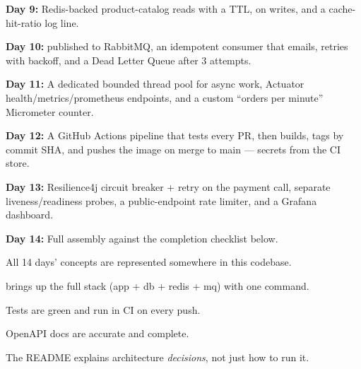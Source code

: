 \begin{checklist}
  \item \textbf{Day 9:} Redis-backed  product-catalog reads with a TTL,  on writes, and a cache-hit-ratio log line.
  \item \textbf{Day 10:}  published to RabbitMQ, an idempotent consumer that emails, retries with backoff, and a Dead Letter Queue after 3 attempts.
  \item \textbf{Day 11:} A dedicated bounded thread pool for async work, Actuator health/metrics/prometheus endpoints, and a custom ``orders per minute'' Micrometer counter.
  \item \textbf{Day 12:} A GitHub Actions pipeline that tests every PR, then builds, tags by commit SHA, and pushes the image on merge to main --- secrets from the CI store.
  \item \textbf{Day 13:} Resilience4j circuit breaker + retry on the payment call, separate liveness/readiness probes, a public-endpoint rate limiter, and a Grafana dashboard.
  \item \textbf{Day 14:} Full assembly against the completion checklist below.
\end{checklist}

\begin{buildalong}
\begin{checklist}
  \item All 14 days' concepts are represented somewhere in this codebase.
  \item {} brings up the full stack (app + db + redis + mq) with one command.
  \item Tests are green and run in CI on every push.
  \item OpenAPI docs are accurate and complete.
  \item The README explains architecture \emph{decisions}, not just how to run it.
\end{checklist}
\end{buildalong}


